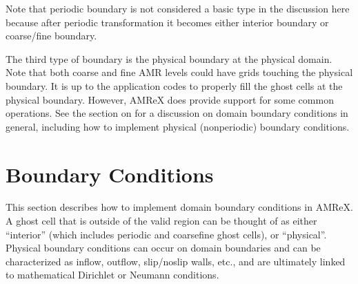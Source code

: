 \documentclass[letterpaper,10pt,english]{sphinxmanual}
\begin{document}
\sphinxAtStartPar
Note that periodic boundary is not considered a basic type in the discussion here because
after periodic transformation it becomes either interior boundary or
coarse/fine boundary.

\sphinxAtStartPar
The third type of boundary is the physical boundary at the physical domain.
Note that both coarse and fine AMR levels could have grids touching the
physical boundary. It is up to the application codes to properly fill the ghost
cells at the physical boundary. However, AMReX does provide support for some
common operations.  See the section on {\hyperref[\detokenize{Basics:sec-basics-boundary}]{}} for a
discussion on domain boundary conditions in general, including how to implement
physical (non\sphinxhyphen{}periodic) boundary conditions.


\section{Boundary Conditions}
\label{\detokenize{Basics:boundary-conditions}}\label{\detokenize{Basics:sec-basics-boundary}}
\sphinxAtStartPar
This section describes how to implement domain boundary conditions in AMReX.  A
ghost cell that is outside of the valid region can be thought of as either
“interior” (which includes periodic and coarse\sphinxhyphen{}fine ghost cells), or “physical”.
Physical boundary conditions can occur on domain boundaries and can
be characterized as inflow, outflow, slip/no\sphinxhyphen{}slip walls, etc., and are
ultimately linked to mathematical Dirichlet or Neumann conditions.
\end{document}
